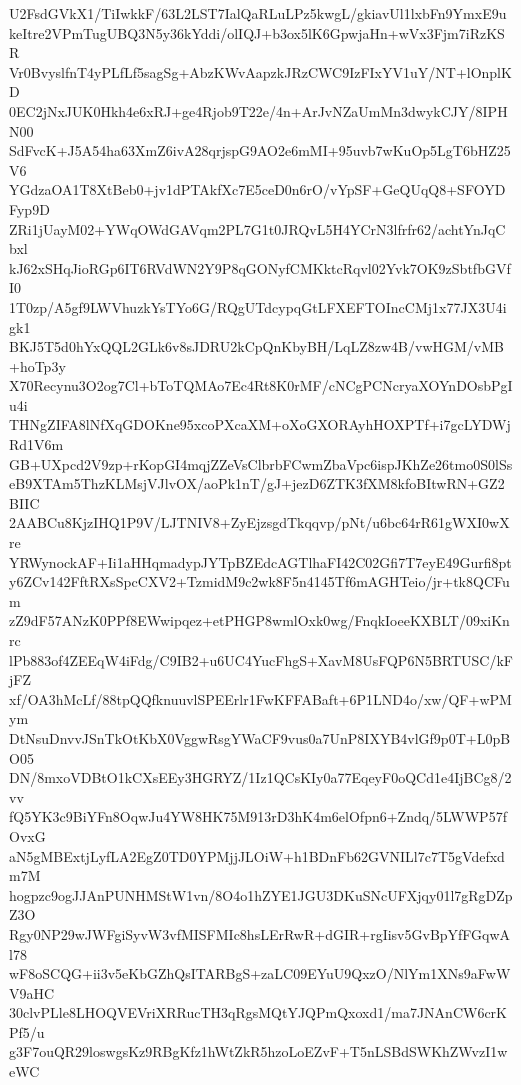 U2FsdGVkX1/TiIwkkF/63L2LST7IalQaRLuLPz5kwgL/gkiavUl1lxbFn9YmxE9u
keItre2VPmTugUBQ3N5y36kYddi/olIQJ+b3ox5lK6GpwjaHn+wVx3Fjm7iRzKSR
Vr0BvyslfnT4yPLfLf5sagSg+AbzKWvAapzkJRzCWC9IzFIxYV1uY/NT+lOnplKD
0EC2jNxJUK0Hkh4e6xRJ+ge4Rjob9T22e/4n+ArJvNZaUmMn3dwykCJY/8IPHN00
SdFvcK+J5A54ha63XmZ6ivA28qrjspG9AO2e6mMI+95uvb7wKuOp5LgT6bHZ25V6
YGdzaOA1T8XtBeb0+jv1dPTAkfXc7E5ceD0n6rO/vYpSF+GeQUqQ8+SFOYDFyp9D
ZRi1jUayM02+YWqOWdGAVqm2PL7G1t0JRQvL5H4YCrN3lfrfr62/achtYnJqCbxl
kJ62xSHqJioRGp6IT6RVdWN2Y9P8qGONyfCMKktcRqvl02Yvk7OK9zSbtfbGVfI0
1T0zp/A5gf9LWVhuzkYsTYo6G/RQgUTdcypqGtLFXEFTOIncCMj1x77JX3U4igk1
BKJ5T5d0hYxQQL2GLk6v8sJDRU2kCpQnKbyBH/LqLZ8zw4B/vwHGM/vMB+hoTp3y
X70Recynu3O2og7Cl+bToTQMAo7Ec4Rt8K0rMF/cNCgPCNcryaXOYnDOsbPgIu4i
THNgZIFA8lNfXqGDOKne95xcoPXcaXM+oXoGXORAyhHOXPTf+i7gcLYDWjRd1V6m
GB+UXpcd2V9zp+rKopGI4mqjZZeVsClbrbFCwmZbaVpc6ispJKhZe26tmo0S0lSs
eB9XTAm5ThzKLMsjVJlvOX/aoPk1nT/gJ+jezD6ZTK3fXM8kfoBItwRN+GZ2BIIC
2AABCu8KjzIHQ1P9V/LJTNIV8+ZyEjzsgdTkqqvp/pNt/u6bc64rR61gWXI0wXre
YRWynockAF+Ii1aHHqmadypJYTpBZEdcAGTlhaFI42C02Gfi7T7eyE49Gurfi8pt
y6ZCv142FftRXsSpcCXV2+TzmidM9c2wk8F5n4145Tf6mAGHTeio/jr+tk8QCFum
zZ9dF57ANzK0PPf8EWwipqez+etPHGP8wmlOxk0wg/FnqkIoeeKXBLT/09xiKnrc
lPb883of4ZEEqW4iFdg/C9IB2+u6UC4YucFhgS+XavM8UsFQP6N5BRTUSC/kFjFZ
xf/OA3hMcLf/88tpQQfknuuvlSPEErlr1FwKFFABaft+6P1LND4o/xw/QF+wPMym
DtNsuDnvvJSnTkOtKbX0VggwRsgYWaCF9vus0a7UnP8IXYB4vlGf9p0T+L0pBO05
DN/8mxoVDBtO1kCXsEEy3HGRYZ/1Iz1QCsKIy0a77EqeyF0oQCd1e4IjBCg8/2vv
fQ5YK3c9BiYFn8OqwJu4YW8HK75M913rD3hK4m6elOfpn6+Zndq/5LWWP57fOvxG
aN5gMBExtjLyfLA2EgZ0TD0YPMjjJLOiW+h1BDnFb62GVNILl7c7T5gVdefxdm7M
hogpzc9ogJJAnPUNHMStW1vn/8O4o1hZYE1JGU3DKuSNcUFXjqy01l7gRgDZpZ3O
Rgy0NP29wJWFgiSyvW3vfMISFMIc8hsLErRwR+dGIR+rgIisv5GvBpYfFGqwAl78
wF8oSCQG+ii3v5eKbGZhQsITARBgS+zaLC09EYuU9QxzO/NlYm1XNs9aFwWV9aHC
30clvPLle8LHOQVEVriXRRucTH3qRgsMQtYJQPmQxoxd1/ma7JNAnCW6crKPf5/u
g3F7ouQR29loswgsKz9RBgKfz1hWtZkR5hzoLoEZvF+T5nLSBdSWKhZWvzI1weWC
